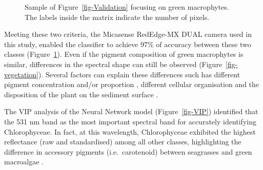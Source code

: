 \documentclass[
  number]{elsarticle}
\begin{document}
\label{cell-fig-ValidationGreen}
\begin{figure}[H]


\caption{\label{fig-ValidationGreen}Sample of
Figure~\ref{fig-Validation} focusing on green macrophytes. The labels
inside the matrix indicate the number of pixels.}

\end{figure}%

Meeting these two criteria, the Micasense RedEdge-MX DUAL camera used in
this study, enabled the classifier to achieve 97\% of accuracy between
these two classes (Figure~\ref{fig-ValidationGreen}). Even if the
pigment composition of green macrophytes is similar, differences in the
spectral shape can still be observed (Figure~\ref{fig-vegetation}).
Several factors can explain these differences such has different pigment
concentration and/or proportion \citep{bargain2013seasonal}, different
cellular organisation and the disposition of the plant on the sediment
surface \citetext{\citealp[ ]{beach1997vivo}; \citealp[
]{kirk1994light}; \citealp{hedley2018influence}}.

The VIP analysis of the Neural Network model (Figure~\ref{fig-VIP})
identified that the 531 nm band as the most important spectral band for
accurately identifying Chlorophyceae. In fact, at this wavelength,
Chlorophyceae exhibited the highest reflectance (raw and standardised)
among all other classes, highlighting the difference in accessory
pigments (i.e.~carotenoid) between seagrasses and green macroalgae
\citep{repolho2017seagrass}.
\end{document}
